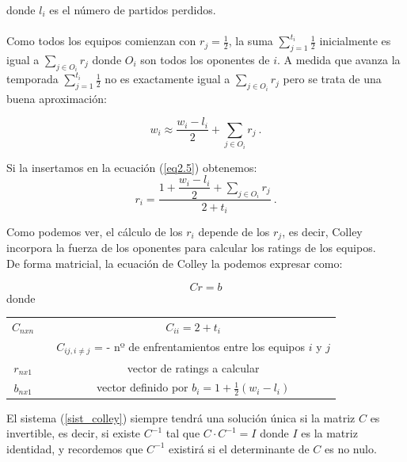 donde $l_{i}$ es el número de partidos perdidos.\\
\\
Como todos los equipos comienzan con $r_{j} = \frac{1}{2}$, la suma $\sum\limits_{j=1}^{t_{i}} \frac{1}{2} $ inicialmente es igual a $\sum\limits_{j \in O_{i}} r_{j} $ donde $O_{i}$ son todos los oponentes de $i$.
A medida que avanza la temporada $\sum\limits_{j=1}^{t_{i}} \frac{1}{2} $ no es exactamente igual a $\sum\limits_{j \in O_{i}} r_{j} $ pero se trata de una buena aproximación:
\begin{center}
	\begin{equation}
		w_{i} \approx \dfrac{w_{i}-l_{i}}{2} + \sum\limits_{j \in O_{i}} r_{j} \ .
	\end{equation}
\end{center}

\newpage

Si la insertamos en la ecuación (\ref{eq2.5}) obtenemos:
\begin{equation}
	r_{i} = \dfrac{1+\dfrac{w_{i}-l_{i}}{2} + \sum\limits_{j \in O_{i}} r_{j}}{2+t_{i}} \ .
\end{equation}

Como podemos ver, el cálculo de los $r_{i}$ depende de los $r_{j}$, es decir, Colley incorpora la fuerza de los oponentes para calcular los ratings de los equipos.\\

De forma matricial, la ecuación de Colley la podemos expresar como:

\begin{equation} \label{sist_colley}
	Cr = b 
\end{equation}
donde
\begin{center}
	\begin{tabular}{ccc}
		\hline $C_{nxn}$ & & $C_{ii} = 2 + t_{i}$  \\
		& & $C_{ij, i \neq j}$ = - nº de enfrentamientos entre los equipos $i$ y $j$\\ 
		\hline  $r_{nx1}$ & & vector de ratings a calcular \\ 
		\hline  $b_{nx1}$ & & vector definido por $b_{i}=1+\frac{1}{2}(w_{i}-l_{i})$\\ 
		\hline 
	\end{tabular}
\end{center} 

El sistema (\ref{sist_colley}) siempre tendrá una solución única si la matriz $C$ es invertible, es decir, si existe $C^{-1}$ tal que $C\cdotp C^{-1} = I$ donde $I$ es la matriz identidad, y recordemos que $C^{-1}$ existirá si el determinante de $C$ es no nulo.

